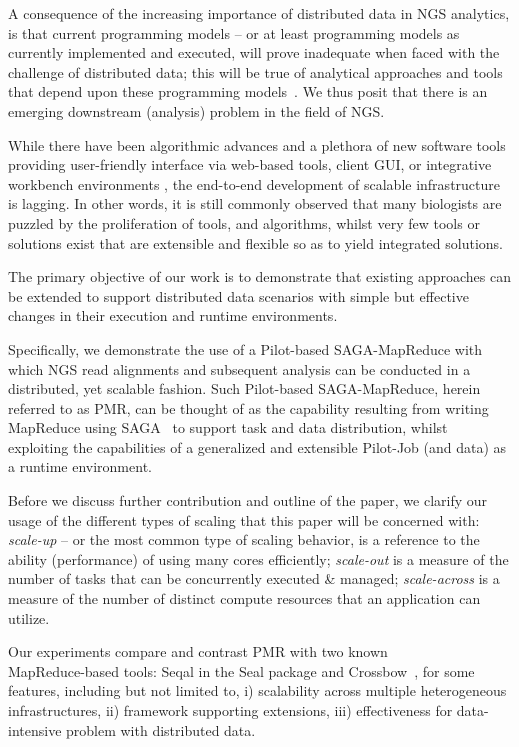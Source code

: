 \documentclass{acm_proc_article-sp}
\begin{document}
A consequence of the increasing importance of distributed data in NGS
analytics, is that current programming models -- or at least
programming models as currently implemented and executed, will prove
inadequate when faced with the challenge of distributed data; this
will be true of analytical approaches and tools that depend upon these
programming models~\cite{makeflow}. We thus posit that there is an emerging downstream
(analysis) problem in the field of NGS. 

While there have been algorithmic advances and a plethora of new
software tools providing user-friendly interface via web-based tools, client GUI, or integrative workbench environments \cite{galaxy}, the end-to-end
development of scalable infrastructure is lagging.  In other words,
it is still commonly observed that many biologists are puzzled by the proliferation of tools, and algorithms, whilst very few tools or solutions exist that are
extensible and flexible so as to yield integrated solutions.
 
The primary objective of our work is to demonstrate that existing
approaches can be extended to support distributed data scenarios with
simple but effective changes in their execution and runtime
environments.

Specifically, we demonstrate the use of a Pilot-based SAGA-MapReduce
with which NGS read alignments and subsequent analysis can be
conducted in a distributed, yet scalable fashion. Such Pilot-based
SAGA-MapReduce, herein referred to as PMR, can be thought of as the
capability resulting from writing MapReduce using SAGA~\cite{saga-home} to support task
and data distribution, whilst exploiting the capabilities of a
generalized and extensible Pilot-Job (and data) as a runtime
environment\cite{Sehgal2011590,pmr2012,pstar11}.

Before we discuss further contribution and outline of the paper, we
clarify our usage of the different types of scaling that this paper
will be concerned with: {\it scale-up} -- or the most common type of
scaling behavior, is a reference to the ability (performance) of using
many cores efficiently; {\it scale-out} is a measure of the number of
tasks that can be concurrently executed \& managed; {\it scale-across}
is a measure of the number of distinct compute resources that an
application can utilize.

Our experiments compare and contrast PMR with two known\\
MapReduce-based tools: Seqal in the Seal package and
Crossbow~\cite{seal2011,langmead2010}, for some features, including
but not limited to, i) scalability across multiple heterogeneous
infrastructures, ii) framework supporting extensions, iii)
effectiveness for data-intensive problem with distributed data.
\end{document}
